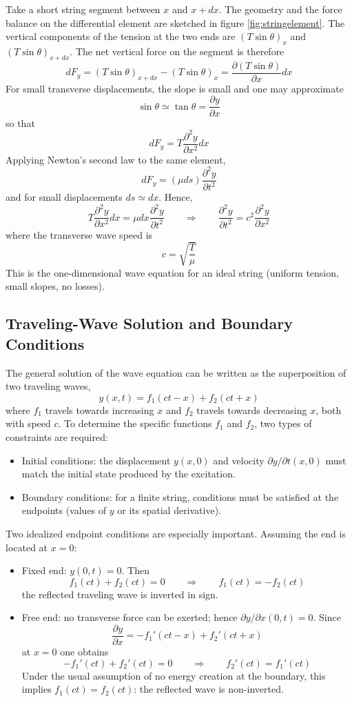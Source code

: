 Take a short string segment between \( x \) and \( x + dx \). The geometry and the force balance on the differential element are sketched in figure \ref{fig:stringelement}. The vertical components of the tension at the two ends are \( (T\sin\theta)_x \) and \( (T\sin\theta)_{x + dx} \). The net vertical force on the segment is therefore
\[
dF_y = (T\sin\theta)_{x + dx} - (T\sin\theta)_x
    = \frac{\partial(T\sin\theta)}{\partial x}dx
\]
For small transverse displacements, the slope is small and one may approximate
\[
\sin\theta \simeq \tan\theta = \frac{\partial y}{\partial x}
\]
so that
\[
dF_y = T\frac{\partial^2 y}{\partial x^2}dx
\]
Applying Newton's second law to the same element,
\[
dF_y = (\mu ds)\frac{\partial^2 y}{\partial t^2}
\]
and for small displacements \( ds\simeq dx \). Hence,
\[
T\frac{\partial^2 y}{\partial x^2}dx = \mu dx\frac{\partial^2 y}{\partial t^2}
\qquad\Longrightarrow\qquad
\frac{\partial^2 y}{\partial t^2} = c^2\frac{\partial^2 y}{\partial x^2}
\]
where the transverse wave speed is
\[
c = \sqrt{\frac{T}{\mu}}
\]
This is the one-dimensional wave equation for an ideal string (uniform tension, small slopes, no losses).

\subsection{Traveling-Wave Solution and Boundary Conditions}

The general solution of the wave equation can be written as the superposition of two traveling waves,
\[
y(x,t) = f_1(ct-x) + f_2(ct + x)
\]
where \( f_1 \) travels towards increasing \( x \) and \( f_2 \) travels towards decreasing \( x \), both with speed \( c \).
To determine the specific functions \( f_1 \) and \( f_2 \), two types of constraints are required:

\begin{itemize}
\item Initial conditions: the displacement \( y(x,0) \) and velocity \( \partial y/\partial t(x,0) \) must match the initial state produced by the excitation.
\item Boundary conditions: for a finite string, conditions must be satisfied at the endpoints (values of \( y \) or its spatial derivative).
\end{itemize}

Two idealized endpoint conditions are especially important. Assuming the end is located at \( x = 0 \):

\begin{itemize}
\item Fixed end: \( y(0,t) = 0 \). Then
\[
f_1(ct) + f_2(ct) = 0
\qquad\Longrightarrow\qquad
f_1(ct) = -f_2(ct)
\]
the reflected traveling wave is inverted in sign.
\item Free end: no transverse force can be exerted; hence \( \partial y/\partial x(0,t) = 0 \). Since
\[
\frac{\partial y}{\partial x} = -f_1'(ct-x) + f_2'(ct + x)
\]
at \( x = 0 \) one obtains
\[
-f_1'(ct) + f_2'(ct) = 0
\qquad\Longrightarrow\qquad
f_2'(ct) = f_1'(ct)
\]
Under the usual assumption of no energy creation at the boundary, this implies \( f_1(ct) = f_2(ct) \): the reflected wave is non-inverted.
\end{itemize}


